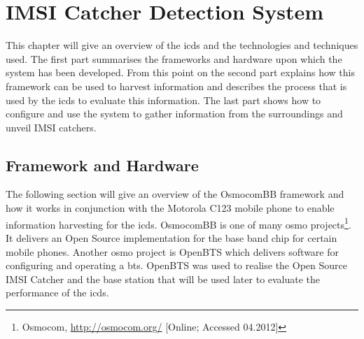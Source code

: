 \chapter{IMSI Catcher Detection System}

This chapter will give an overview of the \gls{icds} and the technologies and techniques used.
The first part summarises the frameworks and hardware upon which the system has been developed.
From this point on the second part explains how this framework can be used to harvest information and describes the process that is used by the \gls{icds} to evaluate this information.
The last part shows how to configure and use the system to gather information from the surroundings and unveil IMSI catchers.

\section{Framework and Hardware}
The following section will give an overview of the OsmocomBB framework and how it works in conjunction with the Motorola C123 mobile phone to enable information harvesting for the \gls{icds}.
OsmocomBB is one of many \gls{osmo} projects\footnote{Osmocom, \url{http://osmocom.org/} [Online; Accessed 04.2012]}. It delivers an Open Source implementation for the base band chip for certain mobile phones.
Another \gls{osmo} project is OpenBTS which delivers software for configuring and operating a \gls{bts}.
OpenBTS was used to realise the Open Source IMSI Catcher \cite{dennis} and the base station that will be used later to evaluate the performance of the \gls{icds}.

